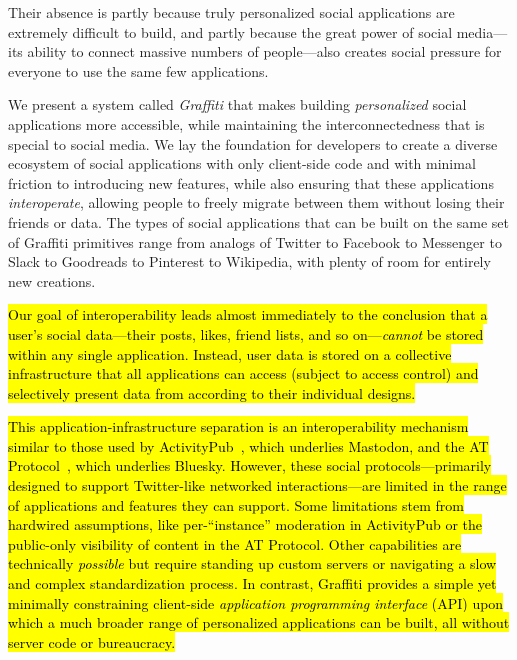 Their absence is partly because truly personalized social applications
are extremely difficult to build,
and partly because the great power of social media---its
ability to connect massive numbers of people---also
creates social pressure for everyone to use the same few applications.

We present a system called \emph{Graffiti} that makes
building \emph{personalized} social applications
more accessible,
while maintaining the interconnectedness that is special to social media.
We lay the foundation for developers to create a diverse ecosystem
of social applications
with only client-side code and with minimal friction
to introducing new features,
while also ensuring that these applications \emph{interoperate},
allowing people to freely migrate between them without
losing their friends or data.
The types of social applications that can be built on the same set of Graffiti primitives range from analogs of Twitter to Facebook to Messenger to Slack to Goodreads to Pinterest to Wikipedia,
with plenty of room for entirely new creations.

\hl{%
Our goal of interoperability leads almost immediately
to the conclusion that a user's
social data---their posts, likes, friend lists, and so on---\emph{cannot}
be stored within any single application.
Instead, user data is stored on a collective infrastructure
that all applications can access (subject to access control)
and selectively present data from according to their individual designs.
}%

\hl{%
This application-infrastructure separation
is an interoperability mechanism similar to
those used by
ActivityPub~{\cite{activitypub}},
which underlies Mastodon,
and the AT Protocol~{\cite{bluesky}}, which underlies Bluesky.
However, these social protocols---primarily designed to support
Twitter-like networked interactions---are limited in the range of applications
and features they can support.
Some limitations stem from hardwired assumptions,
like per-``instance'' moderation in ActivityPub
or the public-only visibility of content in the AT Protocol.
Other capabilities are technically \emph{possible}
but require standing up custom servers or navigating
a slow and complex standardization process.
In contrast, Graffiti provides a simple yet minimally constraining
client-side \emph{application programming interface} (API)
upon which a much broader range of personalized applications can be built, all
without server code or bureaucracy.
}%

